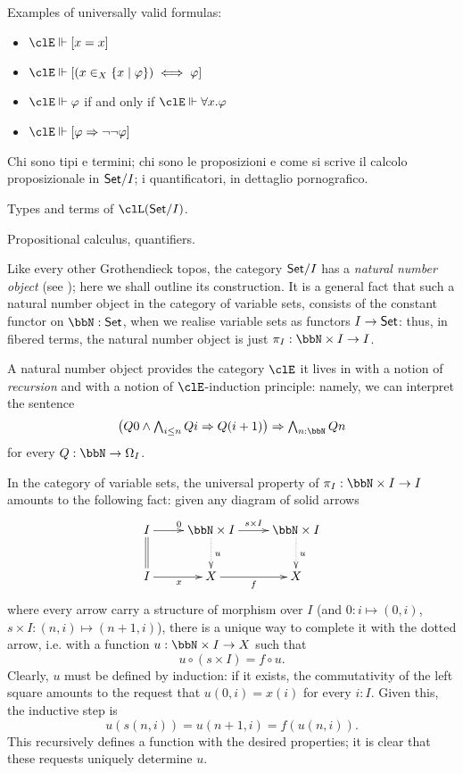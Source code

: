 Examples of universally valid formulas:
\begin{itemize}
	\item $\clE\Vdash [x=x]$
	\item $\clE\Vdash [(x \in_X \{x\mid\varphi\}) \iff \varphi]$
	\item $\clE\Vdash \varphi$ if and only if $\clE \Vdash \forall x.\varphi$
	\item $\clE\Vdash [\varphi \Rightarrow \lnot\lnot\varphi]$
\end{itemize}
Chi sono tipi e termini; chi sono le proposizioni e come si scrive il calcolo proposizionale in $\mathsf{Set}/I$; i quantificatori, in dettaglio pornografico.
\begin{definition}
	Types and terms of $\clL(\Set/I)$.
\end{definition}
\begin{definition}
	Propositional calculus, quantifiers.
\end{definition}
\begin{remark}
	Like every other Grothendieck topos, the category $\mathsf{Set}/I$ has a \emph{natural number object} (see \cite[??]{mac1992sheaves}); here we shall outline its construction. It is a general fact that such a natural number object in the category of variable sets, consists of the constant functor on $\bbN : \Set$, when we realise variable sets as functors $I \to \mathsf{Set}$: thus, in fibered terms, the natural number object is just $\pi_I : \bbN \times I \to I$.

	A natural number object provides the category $\clE$ it lives in with a notion of \emph{recursion} and with a notion of $\clE$-induction principle: namely, we can interpret the sentence
	\[\textstyle\big(Q0\land \bigwedge_{i\le n} Qi\Rightarrow Q(i+1)\big)\Rightarrow \bigwedge_{n : \bbN} Qn\]
	for every $Q : \bbN \to \Omega_I$.

	In the category of variable sets, the universal property of $\pi_I : \bbN\times I \to I$ amounts to the following fact: given any diagram of solid arrows
	\begin{equation}\label{natnumeq}
		\vcenter{\xymatrix{
				I \ar[r]^0 \ar@{=}[d] & \bbN\times I\ar@{.>}[d]^u \ar[r]^{s\times I} & \bbN \times I\ar@{.>}[d]^u \\
				I \ar[r]_x & X \ar[r]_f & X
			}}
	\end{equation}
	where every arrow carry a structure of morphism over $I$ (and $0 : i \mapsto (0,i)$, $s\times I : (n,i) \mapsto (n+1,i)$), there is a unique way to complete it with the dotted arrow, i.e. with a function $u : \bbN \times I \to X$ such that
	\[u \circ (s\times I) = f \circ u.\]
	Clearly, $u$ must be defined by induction: if it exists, the commutativity of the left square amounts to the request that $u(0,i)=x(i)$ for every $i : I$. Given this, the inductive step is
	\[
		u(s(n,i)) = u(n+1,i) = f(u(n,i)).
	\]
	This recursively defines a function with the desired properties; it is clear that these requests uniquely determine $u$.
\end{remark}

